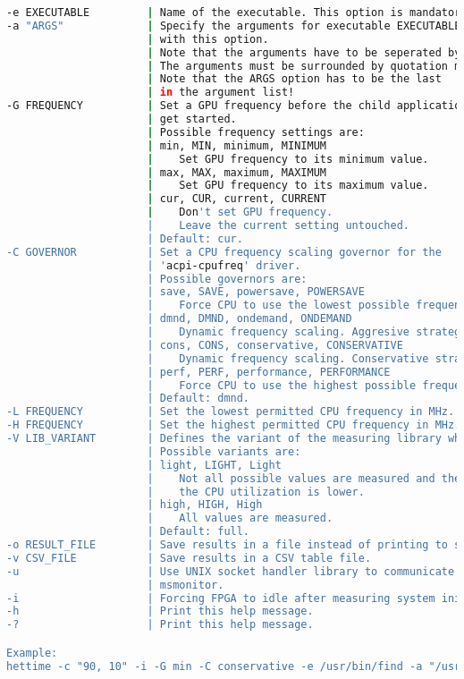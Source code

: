 \begin{lstlisting}[language=sh,basicstyle=\tiny,stringstyle=\color{black},keywordstyle=\color{black}]
-e EXECUTABLE         | Name of the executable. This option is mandatory.
-a "ARGS"             | Specify the arguments for executable EXECUTABLE 
					  | with this option.
                      | Note that the arguments have to be seperated by spaces.
                      | The arguments must be surrounded by quotation marks!
                      | Note that the ARGS option has to be the last
                      | in the argument list!
-G FREQUENCY          | Set a GPU frequency before the child application
					  | get started.
                      | Possible frequency settings are:
                      | min, MIN, minimum, MINIMUM
                      |    Set GPU frequency to its minimum value.
                      | max, MAX, maximum, MAXIMUM
                      |    Set GPU frequency to its maximum value.
                      | cur, CUR, current, CURRENT
                      |    Don't set GPU frequency.
                      |    Leave the current setting untouched.
                      | Default: cur.
-C GOVERNOR           | Set a CPU frequency scaling governor for the
					  | 'acpi-cpufreq' driver.
                      | Possible governors are:
                      | save, SAVE, powersave, POWERSAVE
                      |    Force CPU to use the lowest possible frequency.
                      | dmnd, DMND, ondemand, ONDEMAND
                      |    Dynamic frequency scaling. Aggresive strategy.
                      | cons, CONS, conservative, CONSERVATIVE
                      |    Dynamic frequency scaling. Conservative strategy.
                      | perf, PERF, performance, PERFORMANCE
                      |    Force CPU to use the highest possible frequency.
                      | Default: dmnd.
-L FREQUENCY          | Set the lowest permitted CPU frequency in MHz.
-H FREQUENCY          | Set the highest permitted CPU frequency in MHz.
-V LIB_VARIANT        | Defines the variant of the measuring library which is used.
                      | Possible variants are:
                      | light, LIGHT, Light
                      |    Not all possible values are measured and therefore
                      |    the CPU utilization is lower.
                      | high, HIGH, High
                      |    All values are measured.
                      | Default: full.
-o RESULT_FILE        | Save results in a file instead of printing to stdout.
-v CSV_FILE           | Save results in a CSV table file.
-u                    | Use UNIX socket handler library to communicate with
					  | msmonitor.
-i                    | Forcing FPGA to idle after measuring system initialization.
-h                    | Print this help message.
-?                    | Print this help message.

Example:
hettime -c "90, 10" -i -G min -C conservative -e /usr/bin/find -a "/usr -iname lib*"

\end{lstlisting}
